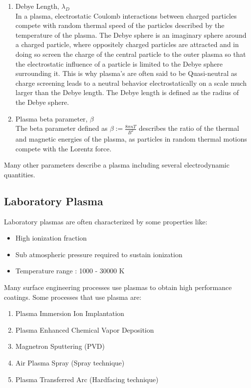 \documentclass[12pt]{article}
\begin{document}
\begin{enumerate}
		\item Debye Length, $\lambda_{D}$ \\
		In a plasma, electrostatic Coulomb interactions between charged particles compete with random thermal speed of the particles described by the temperature of the plasma. The Debye sphere is an imaginary sphere around a charged particle, where oppositely charged particles are attracted and in doing so screen the charge of the central particle to the outer plasma so that the electrostatic influence of a particle is limited to the Debye sphere surrounding it. This is why plasma's are often said to be Quasi-neutral as charge screening leads to a neutral behavior electrostatically on a scale much larger than the Debye length. The Debye length is defined as the radius of the Debye sphere.
		
		\item Plasma beta parameter, $\beta$ \\
		The beta parameter defined as $\beta := \frac{\displaystyle 8 \pi n T}{\displaystyle B^{2}}$ describes the ratio of the thermal and magnetic energies of the plasma, as particles in random thermal motions compete with the Lorentz force.
		
	\end{enumerate} 
		Many other parameters describe a plasma including several electrodynamic quantities.
	
	\subsection{Laboratory Plasma}
	Laboratory plasmas are often characterized by some properties like:
	\begin{itemize}[itemsep=0cm]
		\item High ionization fraction
		\item Sub atmospheric pressure required to sustain ionization
		\item Temperature range : 1000 - 30000 K
	\end{itemize}

	\noindent Many surface engineering processes use plasmas to obtain high performance coatings. Some processes that use plasma are:
	\begin{enumerate}[itemsep=0cm]
		\item Plasma Immersion Ion Implantation
		\item Plasma Enhanced Chemical Vapor Deposition
		\item Magnetron Sputtering (PVD)
		\item Air Plasma Spray (Spray technique)
		\item Plasma Transferred Arc (Hardfacing technique)
	\end{enumerate}
	
\end{document}
